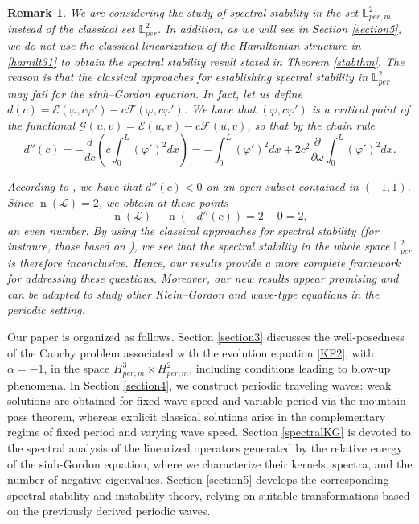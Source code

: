 \documentclass[12pt,reqno,a4paper]{amsart} %
\numberwithin{equation}{section}
\numberwithin{figure}{section}
\newtheorem{remark}[theorem]{Remark}
\begin{document}
\begin{remark} We are considering the study of spectral stability in the set $\mathbb{L}_{per,m}^2$ instead of the classical set $\mathbb{L}_{per}^2$. In addition, as we will see in Section \ref{section5}, we do not use the classical linearization of the Hamiltonian structure in \eqref{hamilt31} to obtain the spectral stability result stated in Theorem \ref{stabthm}. The reason is that the classical approaches for establishing spectral stability in $\mathbb{L}_{per}^2$ may fail for the sinh–Gordon equation. In fact, let us define $\displaystyle d(c)=\mathcal{E}(\varphi,c\varphi')-c\mathcal{F}(\varphi,c\varphi')$. We have that $(\varphi,c\varphi')$ is a critical point of the functional $\displaystyle\mathcal{G}(u,v)=\mathcal{E}(u,v)-c\mathcal{F}(u,v)$, so that by the chain rule
	 $$d''(c)=-\frac{d}{dc}\left(c\int_0^L(\varphi')^2dx\right)=-\int_0^L(\varphi')^2dx+2c^2\frac{\partial}{\partial\omega}\int_0^L(\varphi')^2dx.$$
	
\noindent	 According to \cite[Section 4]{Natali2011}, we have that $d''(c)<0$ on an open subset contained in $(-1,1)$. Since $\operatorname{n}(\mathcal{L})=2$, we obtain at these points
$$\operatorname{n}(\mathcal{L})-\operatorname{n}(-d''(c))=2-0=2,$$
an even number. By using the classical approaches for spectral stability (for instance, those based on \cite{grillakis1}), we see that the spectral stability in the whole space $\mathbb{L}_{per}^2$ is therefore inconclusive. Hence, our results provide a more complete framework for addressing these questions. Moreover, our new results appear promising and can be adapted to study other Klein–Gordon and wave-type equations in the periodic setting.
\end{remark}
\indent Our paper is organized as follows. Section \ref{section3}
discusses the well-posedness of the Cauchy problem associated with the evolution equation \eqref{KF2}, with $\alpha=-1$, in the space $H_{per,m}^3\times H_{per,m}^2$, including conditions leading to  blow-up phenomena. In Section \ref{section4}, we construct periodic traveling waves: weak solutions are obtained for fixed wave-speed and variable period via the mountain pass theorem, whereas explicit classical solutions arise in the complementary regime of fixed period and varying wave speed. Section \ref{spectralKG} is devoted to the spectral analysis of the linearized operators generated by the relative energy of the sinh-Gordon equation, where we characterize their kernels, spectra, and the number of negative eigenvalues. Section \ref{section5} develops the corresponding spectral stability and instability theory, relying on suitable transformations based on the previously derived periodic waves. \\
\end{document}

